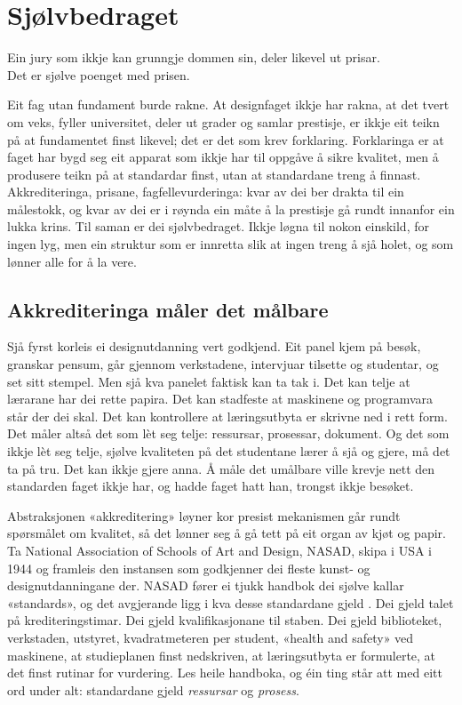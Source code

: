 \chapter{Sjølvbedraget}

\begin{motto}
Ein jury som ikkje kan grunngje dommen sin, deler likevel ut prisar.\\ Det er sjølve poenget med prisen.
\end{motto}

Eit fag utan fundament burde rakne. At designfaget ikkje har rakna, at det tvert om veks, fyller universitet, deler ut grader og samlar prestisje, er ikkje eit teikn på at fundamentet finst likevel; det er det som krev forklaring. Forklaringa er at faget har bygd seg eit apparat som ikkje har til oppgåve å sikre kvalitet, men å produsere teikn på at standardar finst, utan at standardane treng å finnast. Akkrediteringa, prisane, fagfellevurderinga: kvar av dei ber drakta til ein målestokk, og kvar av dei er i røynda ein måte å la prestisje gå rundt innanfor ein lukka krins. Til saman er dei sjølvbedraget. Ikkje løgna til nokon einskild, for ingen lyg, men ein struktur som er innretta slik at ingen treng å sjå holet, og som lønner alle for å la vere.

\section{Akkrediteringa måler det målbare}

Sjå fyrst korleis ei designutdanning vert godkjend. Eit panel kjem på besøk, granskar pensum, går gjennom verkstadene, intervjuar tilsette og studentar, og set sitt stempel. Men sjå kva panelet faktisk kan ta tak i. Det kan telje at lærarane har dei rette papira. Det kan stadfeste at maskinene og programvara står der dei skal. Det kan kontrollere at læringsutbyta er skrivne ned i rett form. Det måler altså det som lèt seg telje: ressursar, prosessar, dokument. Og det som ikkje lèt seg telje, sjølve kvaliteten på det studentane lærer å sjå og gjere, må det ta på tru. Det kan ikkje gjere anna. Å måle det umålbare ville krevje nett den standarden faget ikkje har, og hadde faget hatt han, trongst ikkje besøket.

Abstraksjonen «akkreditering» løyner kor presist mekanismen går rundt spørsmålet om kvalitet, så det lønner seg å gå tett på eit organ av kjøt og papir. Ta National Association of Schools of Art and Design, NASAD, skipa i USA i 1944 og framleis den instansen som godkjenner dei fleste kunst- og designutdanningane der. NASAD fører ei tjukk handbok dei sjølve kallar «standards», og det avgjerande ligg i kva desse standardane gjeld \autocite{nasad_handbook}. Dei gjeld talet på krediteringstimar. Dei gjeld kvalifikasjonane til staben. Dei gjeld biblioteket, verkstaden, utstyret, kvadratmeteren per student, «health and safety» ved maskinene, at studieplanen finst nedskriven, at læringsutbyta er formulerte, at det finst rutinar for vurdering. Les heile handboka, og éin ting står att med eitt ord under alt: standardane gjeld \emph{ressursar} og \emph{prosess}.


